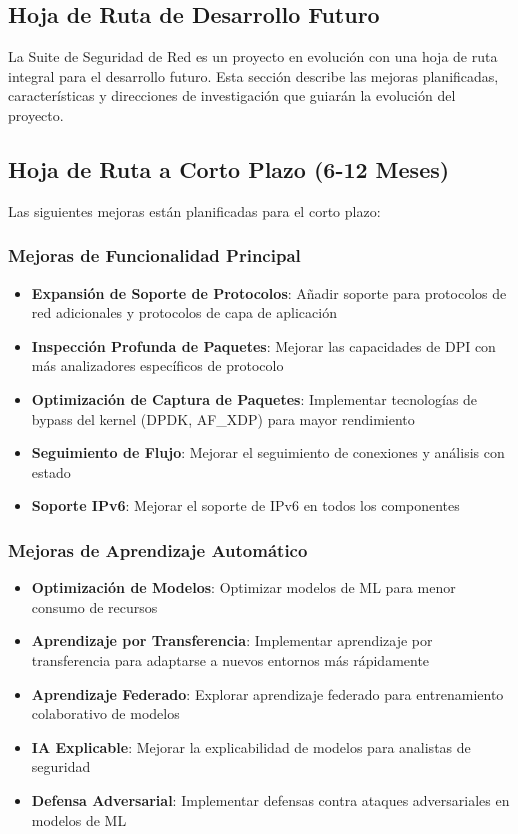 \subsection{Hoja de Ruta de Desarrollo Futuro}
La Suite de Seguridad de Red es un proyecto en evolución con una hoja de ruta integral para el desarrollo futuro. Esta sección describe las mejoras planificadas, características y direcciones de investigación que guiarán la evolución del proyecto.

\subsection{Hoja de Ruta a Corto Plazo (6-12 Meses)}
Las siguientes mejoras están planificadas para el corto plazo:

\subsubsection{Mejoras de Funcionalidad Principal}
\begin{itemize}
    \item \textbf{Expansión de Soporte de Protocolos}: Añadir soporte para protocolos de red adicionales y protocolos de capa de aplicación
    \item \textbf{Inspección Profunda de Paquetes}: Mejorar las capacidades de DPI con más analizadores específicos de protocolo
    \item \textbf{Optimización de Captura de Paquetes}: Implementar tecnologías de bypass del kernel (DPDK, AF\_XDP) para mayor rendimiento
    \item \textbf{Seguimiento de Flujo}: Mejorar el seguimiento de conexiones y análisis con estado
    \item \textbf{Soporte IPv6}: Mejorar el soporte de IPv6 en todos los componentes
\end{itemize}

\subsubsection{Mejoras de Aprendizaje Automático}
\begin{itemize}
    \item \textbf{Optimización de Modelos}: Optimizar modelos de ML para menor consumo de recursos
    \item \textbf{Aprendizaje por Transferencia}: Implementar aprendizaje por transferencia para adaptarse a nuevos entornos más rápidamente
    \item \textbf{Aprendizaje Federado}: Explorar aprendizaje federado para entrenamiento colaborativo de modelos
    \item \textbf{IA Explicable}: Mejorar la explicabilidad de modelos para analistas de seguridad
    \item \textbf{Defensa Adversarial}: Implementar defensas contra ataques adversariales en modelos de ML
\end{itemize}

